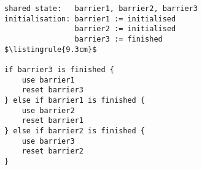 \begin{center}
\begin{minipage}{\textwidth}
\begin{lstlisting}[mathescape, linewidth=9.3cm]
shared state:   barrier1, barrier2, barrier3
initialisation: barrier1 := initialised
                barrier2 := initialised
                barrier3 := finished
$\listingrule{9.3cm}$

if barrier3 is finished {
	use barrier1
	reset barrier3
} else if barrier1 is finished {
	use barrier2
	reset barrier1
} else if barrier2 is finished {
	use barrier3
	reset barrier2
}
\end{lstlisting}
\end{minipage}
\end{center}
